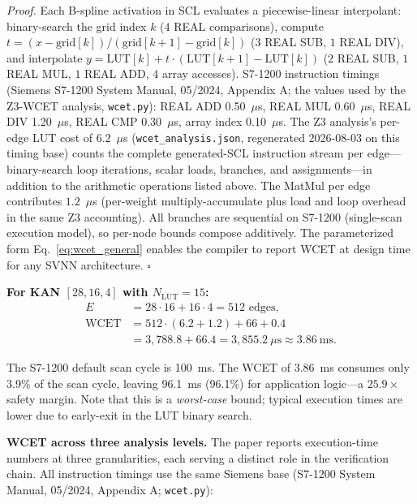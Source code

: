 \documentclass[journal,onecolumn]{IEEEtran}
\begin{document}
\vspace{2pt}
\noindent\textit{Proof.}
Each B-spline activation in SCL evaluates a piecewise-linear interpolant:
binary-search the grid index $k$ ($4$ REAL comparisons), compute
$t = (x - \text{grid}[k]) / (\text{grid}[k+1] - \text{grid}[k])$
($3$ REAL SUB, $1$ REAL DIV), and interpolate
$y = \text{LUT}[k] + t \cdot (\text{LUT}[k+1] - \text{LUT}[k])$
($2$ REAL SUB, $1$ REAL MUL, $1$ REAL ADD, $4$ array accesses).
S7-1200 instruction timings (Siemens S7-1200 System Manual, 05/2024,
Appendix A; the values used by the Z3-WCET analysis, \texttt{wcet.py}):
REAL ADD 0.50~$\mu$s, REAL MUL 0.60~$\mu$s, REAL DIV 1.20~$\mu$s,
REAL CMP 0.30~$\mu$s, array index 0.10~$\mu$s.
The Z3 analysis's per-edge LUT cost of $6.2$~$\mu$s
(\texttt{wcet\_analysis.json}, regenerated 2026-08-03 on this timing
base) counts the complete generated-SCL instruction stream per
edge---binary-search loop iterations, scalar loads, branches, and
assignments---in addition to the arithmetic operations listed above.
The MatMul per edge contributes
$1.2$~$\mu$s (per-weight multiply-accumulate plus load and loop overhead
in the same Z3 accounting). All branches are
sequential on S7-1200 (single-scan execution model), so per-node
bounds compose additively. The parameterized form
Eq.~\ref{eq:wcet_general} enables the compiler to report WCET
at design time for any SVNN architecture. $\square$

\vspace{4pt}
\noindent\textbf{For KAN $[28,16,4]$ with $N_{\text{LUT}}=15$:}
\begin{align*}
E &= 28 \cdot 16 + 16 \cdot 4 = 512 \text{ edges}, \\
\text{WCET} &= 512 \cdot (6.2 + 1.2) + 66 + 0.4 \\
            &= 3{,}788.8 + 66.4
             = 3{,}855.2~\mu\text{s} \approx 3.86~\text{ms}.
\end{align*}

The S7-1200 default scan cycle is 100~ms. The WCET of 3.86~ms
consumes only 3.9\% of the scan cycle, leaving 96.1~ms (96.1\%)
for application logic—a $\mathbf{25.9\times}$ safety margin.
Note that this is a \textit{worst-case} bound; typical execution
times are lower due to early-exit in the LUT binary search.

\vspace{4pt}
\noindent\textbf{WCET across three analysis levels.}
The paper reports execution-time numbers at three granularities, each
serving a distinct role in the verification chain. All instruction
timings use the same Siemens base (S7-1200 System Manual, 05/2024,
Appendix A; \texttt{wcet.py}):
\end{document}
